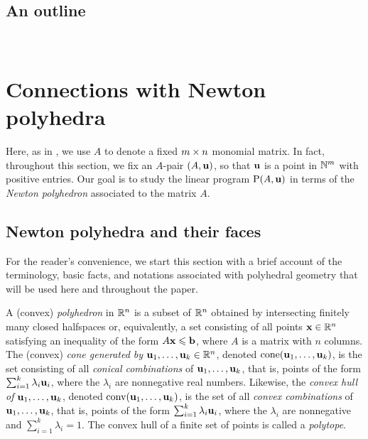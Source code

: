 \documentclass{amsart}
\begin{document}
\subsection{An outline}

\ 

\section{Connections with Newton polyhedra}
\label{s: newton}
Here, as in ,  we use $A$ to denote a fixed $m \times n$ monomial matrix.
In fact, throughout this section, we fix an $A$-pair $(A, \mathbf{u})$, so that $\mathbf{u}$ is a point in $\mathbb{N}^m$ with positive entries.
Our goal is to study the linear program $\mathrm{P}(A, \mathbf{u})$ in terms of the \emph{Newton polyhedron} associated to the matrix $A$.

\subsection{Newton polyhedra and their faces}

For the reader's convenience, we start this section with a brief account of the terminology, basic facts, and notations associated with polyhedral geometry that will be used here and throughout the paper.

A (convex) \emph{polyhedron} in $\mathbb{R}^n$ is a subset of $\mathbb{R}^n$ obtained by intersecting finitely many closed halfspaces or, equivalently, a set consisting of all points $\mathbf{x}\in \mathbb{R}^n$ satisfying an inequality of the form $A\mathbf{x}\leqslant \mathbf{b}$, where $A$ is a matrix with $n$ columns.
The (convex) \emph{cone generated by $\mathbf{u}_1,\ldots,\mathbf{u}_k \in \mathbb{R}^n$}, denoted $\operatorname{cone}(\mathbf{u}_1,\ldots,\mathbf{u}_k)$, is the set consisting of all \emph{conical combinations} of $\mathbf{u}_1, \ldots, \mathbf{u}_k$, that is, points of the form $\sum_{i=1}^k \lambda_i \mathbf{u}_i$, where the $\lambda_i$ are nonnegative real numbers.
Likewise, the \emph{convex hull of $\mathbf{u}_1,\ldots,\mathbf{u}_k$}, denoted $\operatorname{conv}(\mathbf{u}_1,\ldots,\mathbf{u}_k)$, is the set of all \emph{convex combinations} of $\mathbf{u}_1, \ldots, \mathbf{u}_k$, that is, points of the form $\sum_{i=1}^k \lambda_i \mathbf{u}_i$, where the $\lambda_i$ are nonnegative and $\sum_{i=1}^k \lambda_i = 1$.
The convex hull of a finite set of points is called a \emph{polytope}.
\end{document}
